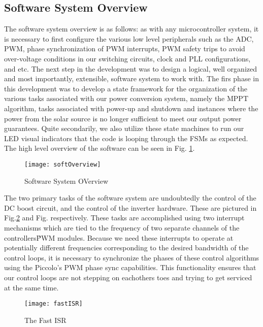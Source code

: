 \subsection{Software System Overview}
\label{softOver}
The software system overview is as follows: as with any microcontroller system, it is necessary to first configure the various low level peripherals such as the ADC, PWM, phase synchronization of PWM interrupts, PWM safety trips to avoid over-voltage conditions in our switching circuits, clock and PLL configurations, and etc. The next step in the development was to design a logical, well organized and most importantly, extensible, software system to work with. The firs phase in this development was to develop a state framework for the organization of the various tasks associated with our power conversion system, namely the MPPT algorithm, tasks associated with power-up and shutdown and instances where the power from the solar source is no longer sufficient to meet our output power guarantees. Quite secondarily, we also utilize these state machines to run our LED visual indicators that the code is looping through the FSMs as expected. The high level overview of the software can be seen in Fig. \ref{soft}.

\begin{figure}[htp]
\begin{center}
\texttt{[image: softOverview]}
\caption{Software System OVerview}
\label{soft}
\end{center}
\end{figure}

The two primary tasks of the software system are undoubtedly the control of the DC boost circuit, and the control of the inverter hardware. These are pictured in Fig.\ref{fast} and Fig.\cite{fast} respectively. These tasks are accomplished using two interrupt mechanisms which are tied to the frequency of two separate channels of the controllers\' PWM modules. Because we need these interrupts to operate at potentially different frequencies corresponding to the desired bandwidth of the control loops, it is necessary to synchronize the phases of these control algorithms using the Piccolo's PWM phase sync capabilities. This functionality ensures that our control loops are not stepping on eachothers toes and trying to get serviced at the same time. 

\begin{figure}[h]
\begin{center}
\texttt{[image: fastISR]}
\caption{The Fast ISR}
\label{fast}
\end{center}
\end{figure}
